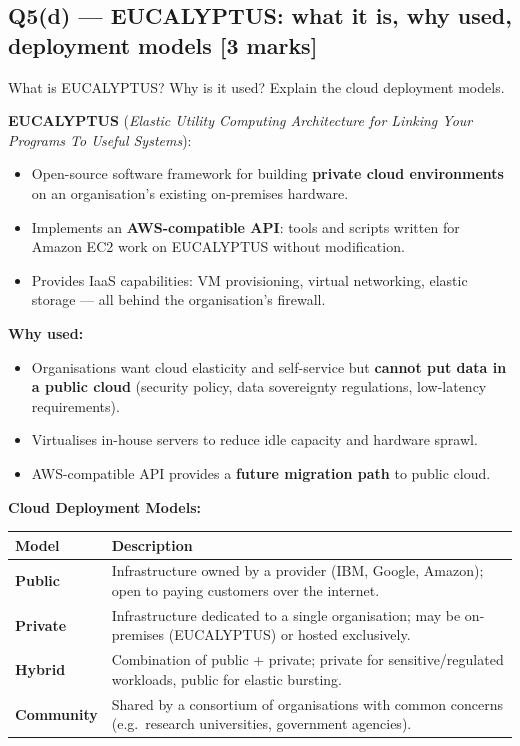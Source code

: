 \documentclass[12pt, a4paper]{article}
\newenvironment{qbox}{\begin{mdframed}[style=qframe]}{\end{mdframed}}
\newenvironment{solbox}{\begin{mdframed}[style=solframe]}{\end{mdframed}}
\newcommand{\qmarks}[1]{\hfill\textbf{\color{orange!70!black}[#1 marks]}}
\begin{document}
\subsection{Q5(d) --- EUCALYPTUS: what it is, why used, deployment models
  \texorpdfstring{\qmarks{3}}{}}
\begin{qbox}What is EUCALYPTUS? Why is it used? Explain the cloud deployment models.\end{qbox}
\begin{solbox}
\textbf{EUCALYPTUS} (\textit{Elastic Utility Computing Architecture for Linking Your
Programs To Useful Systems}):
\begin{itemize}[leftmargin=1.4cm, itemsep=2pt]
  \item Open-source software framework for building \textbf{private cloud environments} on
    an organisation's existing on-premises hardware.
  \item Implements an \textbf{AWS-compatible API}: tools and scripts written for Amazon EC2
    work on EUCALYPTUS without modification.
  \item Provides IaaS capabilities: VM provisioning, virtual networking, elastic storage ---
    all behind the organisation's firewall.
\end{itemize}

\textbf{Why used:}
\begin{itemize}[leftmargin=1.4cm, itemsep=2pt]
  \item Organisations want cloud elasticity and self-service but \textbf{cannot put data in a
    public cloud} (security policy, data sovereignty regulations, low-latency requirements).
  \item Virtualises in-house servers to reduce idle capacity and hardware sprawl.
  \item AWS-compatible API provides a \textbf{future migration path} to public cloud.
\end{itemize}

\textbf{Cloud Deployment Models:}
\begin{center}\renewcommand{\arraystretch}{1.3}
\begin{tabularx}{\linewidth}{l X}
\toprule
\textbf{Model} & \textbf{Description} \\
\midrule
\textbf{Public}    & Infrastructure owned by a provider (IBM, Google, Amazon); open to paying
                     customers over the internet. \\
\textbf{Private}   & Infrastructure dedicated to a single organisation; may be on-premises
                     (EUCALYPTUS) or hosted exclusively. \\
\textbf{Hybrid}    & Combination of public + private; private for sensitive/regulated workloads,
                     public for elastic bursting. \\
\textbf{Community} & Shared by a consortium of organisations with common concerns (e.g.\ research
                     universities, government agencies). \\
\bottomrule
\end{tabularx}\end{center}
\end{solbox}
\end{document}
